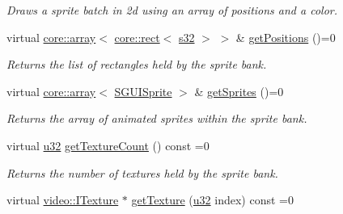 \begin{DoxyCompactItemize}
\begin{DoxyCompactList}\small\item\em Draws a sprite batch in 2d using an array of positions and a color. \end{DoxyCompactList}\item 
\mbox{\label{classirr_1_1gui_1_1IGUISpriteBank_ad32440617fd62d4d423c2814b2b4470e}} 
virtual \hyperlink{classirr_1_1core_1_1array}{core\+::array}$<$ \hyperlink{classirr_1_1core_1_1rect}{core\+::rect}$<$ \hyperlink{namespaceirr_ac66849b7a6ed16e30ebede579f9b47c6}{s32} $>$ $>$ \& \hyperlink{classirr_1_1gui_1_1IGUISpriteBank_ad32440617fd62d4d423c2814b2b4470e}{get\+Positions} ()=0
\begin{DoxyCompactList}\small\item\em Returns the list of rectangles held by the sprite bank. \end{DoxyCompactList}\item 
\mbox{\label{classirr_1_1gui_1_1IGUISpriteBank_a275b3d962407ea5b57bd2d526aae0be3}} 
virtual \hyperlink{classirr_1_1core_1_1array}{core\+::array}$<$ \hyperlink{structirr_1_1gui_1_1SGUISprite}{S\+G\+U\+I\+Sprite} $>$ \& \hyperlink{classirr_1_1gui_1_1IGUISpriteBank_a275b3d962407ea5b57bd2d526aae0be3}{get\+Sprites} ()=0
\begin{DoxyCompactList}\small\item\em Returns the array of animated sprites within the sprite bank. \end{DoxyCompactList}\item 
\mbox{\label{classirr_1_1gui_1_1IGUISpriteBank_aa3b81dd3d2bb43acb1ba2357f722196d}} 
virtual \hyperlink{namespaceirr_a0416a53257075833e7002efd0a18e804}{u32} \hyperlink{classirr_1_1gui_1_1IGUISpriteBank_aa3b81dd3d2bb43acb1ba2357f722196d}{get\+Texture\+Count} () const =0
\begin{DoxyCompactList}\small\item\em Returns the number of textures held by the sprite bank. \end{DoxyCompactList}\item 
\mbox{\label{classirr_1_1gui_1_1IGUISpriteBank_a8a8c324def2abd4e3e6d84aa7689d056}} 
virtual \hyperlink{classirr_1_1video_1_1ITexture}{video\+::\+I\+Texture} $\ast$ \hyperlink{classirr_1_1gui_1_1IGUISpriteBank_a8a8c324def2abd4e3e6d84aa7689d056}{get\+Texture} (\hyperlink{namespaceirr_a0416a53257075833e7002efd0a18e804}{u32} index) const =0

\end{DoxyCompactItemize}
